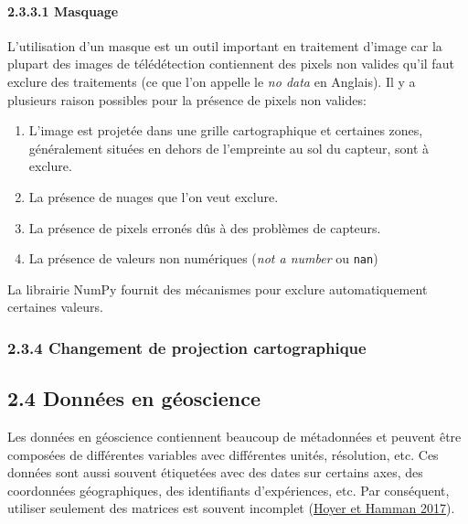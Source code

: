 \documentclass[
]{article}
\begin{document}
\paragraph{\texorpdfstring{{2.3.3.1}
Masquage}{2.3.3.1 Masquage}}\label{masquage}

L'utilisation d'un masque est un outil important en traitement d'image
car la plupart des images de télédétection contiennent des pixels non
valides qu'il faut exclure des traitements (ce que l'on appelle le
\emph{no data} en Anglais). Il y a plusieurs raison possibles pour la
présence de pixels non valides:

\begin{enumerate}
\def\labelenumi{\arabic{enumi}.}
\item
  L'image est projetée dans une grille cartographique et certaines
  zones, généralement situées en dehors de l'empreinte au sol du
  capteur, sont à exclure.
\item
  La présence de nuages que l'on veut exclure.
\item
  La présence de pixels erronés dûs à des problèmes de capteurs.
\item
  La présence de valeurs non numériques (\emph{not a number} ou
  \texttt{nan})
\end{enumerate}

La librairie NumPy fournit des mécanismes pour exclure automatiquement
certaines valeurs.

\subsubsection{\texorpdfstring{{2.3.4} Changement de projection
cartographique}{2.3.4 Changement de projection cartographique}}\label{changement-de-projection-cartographique}

\subsection{\texorpdfstring{{2.4} Données en
géoscience}{2.4 Données en géoscience}}\label{donnuxe9es-en-guxe9oscience}

Les données en géoscience contiennent beaucoup de métadonnées et peuvent
être composées de différentes variables avec différentes unités,
résolution, etc. Ces données sont aussi souvent étiquetées avec des
dates sur certains axes, des coordonnées géographiques, des identifiants
d'expériences, etc. Par conséquent, utiliser seulement des matrices est
souvent incomplet {(\href{references.html\#ref-xarray-2017}{Hoyer et
Hamman 2017})}.
\end{document}
